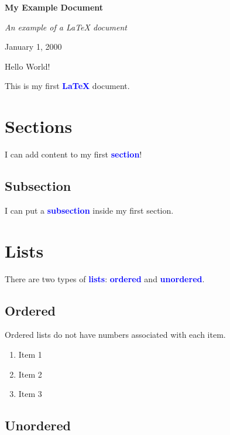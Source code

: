 \documentclass{article}
\newcommand{\kw}[1]{\textcolor{blue}{\textbf{#1}}}
\begin{document}

\begin{titlepage}
    \centering

    \huge
    \textbf{My Example Document}

    \vspace{1cm}
    \normalsize
    \textit{An example of a LaTeX document}

    \vfill
    January 1, 2000
\end{titlepage}

Hello World!

This is my first \kw{LaTeX} document.

\section{Sections}

I can add content to my first \kw{section}!

\subsection{Subsection}

I can put a \kw{subsection} inside my first section.

\section{Lists}

There are two types of \kw{lists}: \kw{ordered} and \kw{unordered}.

\subsection{Ordered}

Ordered lists do not have numbers associated with each item.

\begin{enumerate}
  \item Item 1
  \item Item 2
  \item Item 3
\end{enumerate}

\subsection{Unordered}
\end{document}
